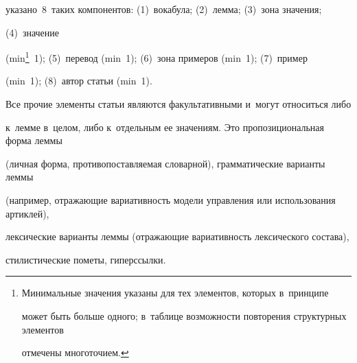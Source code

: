 указано~8~таких компонентов: (1)~вокабула; (2)~лемма; (3)~зона значения; 

(4)~значение 

(min\footnote{Минимальные значения указаны для тех элементов, которых в~принципе 

может быть больше одного; в~таблице возможности повторения структурных элементов 

отмечены многоточием.}~1); (5)~перевод (min~1); (6)~зона примеров (min~1); (7)~пример 

(min~1); (8)~автор статьи (min~1).











  

  Все прочие элементы статьи являются факультативными и~могут относиться либо 

к~лемме в~целом, либо к~отдельным ее значениям. Это пропозициональная форма леммы 

(личная форма, противопоставляемая словарной), грамматические варианты леммы 

(например, отражающие вариативность модели управления или использования артиклей), 

лексические варианты леммы (отражающие вариативность лексического состава), 

стилистические пометы, гиперссылки.



